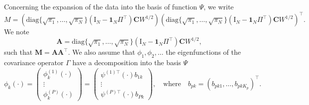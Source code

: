 Concerning the expansion of the data into the basis of function $\Psi$, we write 
\begin{equation}
    M = \left(\text{diag}\{
        \sqrt{\pi_1}, \dots, \sqrt{\pi_N}\}\left(\mathrm{I}_{\!N} - \mathbf{1}_{\!N}\Pi^\top\right) \mathbf{C}W^{1/2}\right)\left(\text{diag}\{
        \sqrt{\pi_1}, \dots, \sqrt{\pi_N}\}\left(\mathrm{I}_{\!N} - \mathbf{1}_{\!N}\Pi^\top\right) \mathbf{C}W^{1/2}\right)^\top.
\end{equation}
We note
\begin{equation}
    \mathbf{A} = \text{diag}\{\sqrt{\pi_1}, \dots, \sqrt{\pi_N}\}\left(\mathrm{I}_{\!N} - \mathbf{1}_{\!N}\Pi^\top\right) \mathbf{C}W^{1/2},
\end{equation}
such that $\mathbf{M} = \mathbf{A}\mathbf{A}^\top$.
We also assume that $\phi_1, \phi_2, \dots$ the eigenfunctions of the covariance operator $\Gamma$ have a decomposition into the basis $\Psi$
\begin{equation}
    \phi_k(\cdot) = 
        \begin{pmatrix} 
            \phi_k^{(1)}(\cdot) \\
            \vdots \\
            \phi_k^{(P)}(\cdot)
        \end{pmatrix} = 
        \begin{pmatrix} 
            \psi^{(1) \top}(\cdot) b_{1k} \\
            \vdots \\
            \psi^{(P) \top}(\cdot) b_{Pk}
        \end{pmatrix}, \quad\text{where}\quad
        b_{pk} = \left(b_{p k 1}, \dots, b_{p k K_p} \right)^\top.
\end{equation}

